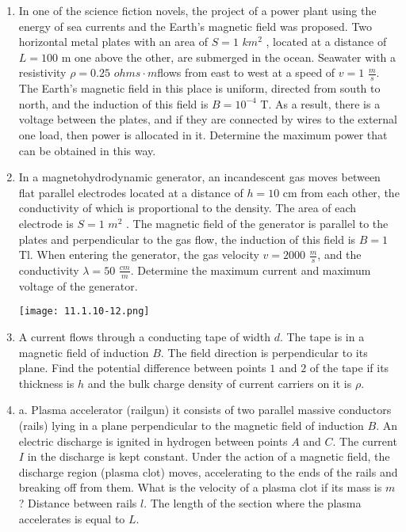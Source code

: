 \documentclass{article}
\begin{document}
\begin{enumerate}[label=11.1.\arabic*]
\item In one of the science fiction novels, the project of a power plant using the energy of sea currents and the Earth's magnetic field was proposed. Two horizontal metal plates with an area of $S = 1$ $km^2$ , located at a distance of $L = 100$ m one above the other, are submerged in the ocean. Seawater with a resistivity $\rho = 0.25$ $ohms \cdot m $flows from east to west at a speed of $v = 1$ $\frac{m}{s}$. The Earth's magnetic field in this place is uniform, directed from south to north, and the induction of this field is $B = 10^{-4}$ T. As a result, there is a voltage between the plates, and if they are connected by wires to the external one  load, then power is allocated in it. Determine the maximum power that can be obtained in this way.


\item In a magnetohydrodynamic generator, an incandescent gas moves between flat parallel electrodes located at a distance of $h = 10$ cm from each other, the conductivity of which is proportional to the density. The area of each electrode is $S = 1$ $m^2$ . The magnetic field of the generator is parallel to the plates and perpendicular to the gas flow, the induction of this field is $B = 1$ Tl. When entering the generator, the gas velocity $v = 2000$ $\frac{m}{s}$, and the conductivity $\lambda = 50$ $\frac{cm}{m}$. Determine the maximum current and maximum voltage of the generator.

\begin{center}
    \texttt{[image: 11.1.10-12.png]}
\end{center}

\item A current flows through a conducting tape of width $d$. The tape is in a magnetic field of induction $B$. The field direction is perpendicular to its plane. Find the potential difference between points $1$ and $2$ of the tape if its thickness is $h$ and the bulk charge density of current carriers on it is $\rho$.

\item a. Plasma accelerator (railgun) it consists of two parallel massive conductors (rails) lying in a plane perpendicular to the magnetic field of induction $B$. An electric discharge is ignited in hydrogen between points $A$ and $C$. The current $I$ in the discharge is kept constant. Under the action of a magnetic field, the discharge region (plasma clot) moves, accelerating to the ends of the rails and breaking off from them. What is the velocity of a plasma clot if its mass is $m$? Distance between rails $l$. The length of the section where the plasma accelerates is equal to $L$.


\end{enumerate}
\end{document}
